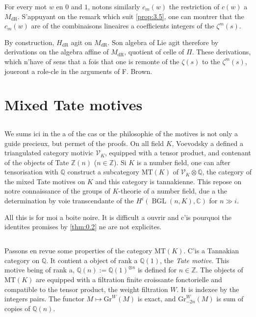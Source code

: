 \documentclass[11pt,a4paper]{article}
\theoremstyle{plain}
\theoremstyle{definition}
\DeclareMathOperator{\BGL}{BGL}
\newcommand{\Z}{\mathbb{Z}}
\newcommand{\Q}{\mathbb{Q}}
\newcommand{\C}{\mathbb{C}}
\newcommand{\dR}{\mathrm{dR}}
\newcommand{\Gr}{\mathrm{Gr}}
\newcommand{\MT}{\mathrm{MT}}
\begin{document}
For every mot $w$ en $0$ and $1$, notons similarly $c_m(w)$ the restriction of $c(w)$ a $M_{\dR}$. S'appuyant on the remark which suit \ref{prop:3.5}, one can montrer that the $c_m(w)$ are of the combinaisons lineaires a coefficients integers of the $\zeta^m(s)$.

By construction, $H_{\dR}$ agit on $M_{\dR}$. Son algebra of Lie agit therefore by derivations on the algebra affine of $M_{\dR}$, quotient of celle of $\Pi$. These derivations, which n'have of sens that a fois that one is remonte of the $\zeta(s)$ to the $\zeta^m(s)$, joueront a role-cle in the arguments of F. Brown.

\section{Mixed Tate motives}\label{sec:5}

\subsection{}\label{ssec:5.1}

We sums ici in the a of the cas or the philosophie of the motives is not only a guide precieux, but permet of the proofs. On all field $K$, Voevodsky a defined a triangulated category motivic $\mathcal{V}_K$, equipped with a tensor product, and contenant of the objects of Tate $\Z(n)$ ($n \in \Z$). Si $K$ is a number field, one can after tensorisation with $\Q$ construct a subcategory $\MT(K)$ of $\mathcal{V}_K \otimes \Q$, the category of the mixed Tate motives on $K$ and this category is tannakienne. This repose on notre connaissance of the groups of $K$-theorie of a number field, due a the determination by voie transcendante of the $H^i(\BGL(n,K),\C)$ for $n \gg i$.

All this is for moi a boite noire. It is difficult a ouvrir and c'is pourquoi the identites promises by \ref{thm:0.2} ne are not explicites.

\subsection{}\label{ssec:5.2}

Passons en revue some properties of the category $\MT(K)$. C'is a Tannakian category on $\Q$. It contient a object of rank a $\Q(1)$, the \emph{Tate motive}. This motive being of rank a, $\Q(n) := \Q(1)^{\otimes n}$ is defined for $n \in \Z$. The objects of $\MT(K)$ are equipped with a filtration finite croissante fonctorielle and compatible to the tensor product, the weight filtration $W$. It is indexee by the integers pairs. The functor $M \mapsto \Gr^W(M)$ is exact, and $\Gr^W_{-2n}(M)$ is sum of copies of $\Q(n)$.
\end{document}

